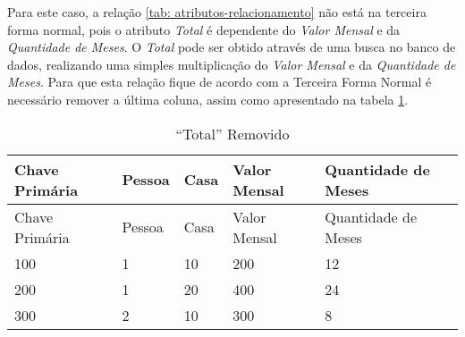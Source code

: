     
Para este caso, a relação \ref{tab: atributos-relacionamento} não está na terceira forma normal, pois o atributo \textit{Total} é dependente do \textit{Valor Mensal} e da \textit{Quantidade de Meses}. O \textit{Total} pode ser obtido através de uma busca no banco de dados, realizando uma simples multiplicação do \textit{Valor Mensal} e da \textit{Quantidade de Meses}. Para que esta relação fique de acordo com a Terceira Forma Normal é necessário remover a última coluna, assim como apresentado na tabela \ref{tab: total-a-pagar-removido}.
    
\begin{longtable}[]{@{}lllll@{}}
\caption{``Total'' Removido \label{tab: total-a-pagar-removido}}\tabularnewline
\toprule
Chave Primária & Pessoa & Casa & Valor Mensal & Quantidade de Meses\tabularnewline
\midrule
\endfirsthead
\toprule
Chave Primária & Pessoa & Casa & Valor Mensal & Quantidade de Meses\tabularnewline
\midrule
\endhead
100 & 1 & 10 & 200 & 12\tabularnewline
200 & 1 & 20 & 400 & 24\tabularnewline
300 & 2 & 10 & 300 & 8\tabularnewline
\bottomrule
\end{longtable}

